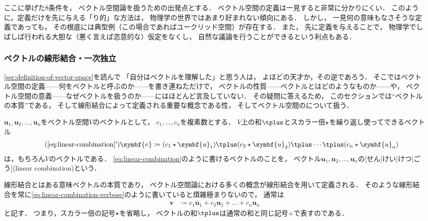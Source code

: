 \documentclass[
]{sotsu}
\begin{document}
ここに挙げた8条件を，
ベクトル空間論を扱うための出発点とする．
ベクトル空間の定義は一見すると非常に分かりにくい．
このように，定義だけを先に与える「り的」な方法は，
物理学の世界ではあまり好まれない傾向にある．
しかし，
一見何の意味もなさそうな定義であっても，
その根底には典型例（この場合であればユークリッド空間）が存在する．
また，
先に定義を与えることで，
物理学でしばしば行われる大胆な（悪く言えば恣意的な）仮定をなくし，
自然な議論を行うことができるという利点もある．





\subsubsection{ベクトルの線形結合・一次独立}
\label{sec:linear-combination-and-linearly-independent}


\cref{sec:definition-of-vector-space}を読んで
「自分はベクトルを理解した」と思う人は，
よほどの天才か，その逆であろう．
そこではベクトル空間の定義------\textsf{何をベクトルと呼ぶのか}------を書き連ねただけで，
ベクトルの性質------\textsf{ベクトルとはどのようなものか}------や，
ベクトル空間の意義------\textsf{なぜベクトルを扱うのか}------にはほとんど言及していない．
その疑問に答えるため，
このセクションでは``ベクトルの本質''である，
そして線形結合によって定義される重要な概念である性，
そしてベクトル空間のについて扱う．






\quad
$\symbf{u}_1, \symbf{u}_2, \dots, \symbf{u}_n$をベクトル空間$V$のベクトルとして，
$c_1, \dots, c_n$を複素数とする．
$V$上の和$\vecplus$とスカラー倍$\mathbin{\star}$を繰り返し使ってできるベクトル
\begin{equation}
    \label{eq:linear-combination-verbose}
    \tag{\ref*{eq:linear-combination}$'$}
        \symbf{v} \coloneq 
            (c_1 \scaprod \symbf{u}_1) \vecplus (c_2 \scaprod \symbf{u}_2) \vecplus \dotsb \vecplus (c_n \scaprod \symbf{u}_n)
\end{equation}
は，もちろん$V$のベクトルである．
\cref{eq:linear-combination}のように書けるベクトルのことを，
ベクトル$\symbf{u}_1, \symbf{u}_2, \dots, \symbf{u}_n$の[せん|けい|けつ|ごう](linear combination)という．

線形結合とはある意味ベクトルの本質であり，
ベクトル空間論における多くの概念が線形結合を用いて定義される．
そのような線形結合を常に\cref{eq:linear-combination-verbose}のように書いていると煩雑極まりないので，
通常は
\begin{equation}
    \label{eq:linear-combination}
    \begin{split}
        \symbf{v} 
        &\coloneq 
            c_1 \symbf{u}_1 + c_2 \symbf{u}_2 + \dots + c_n \symbf{u}_n
    \end{split}
\end{equation}
と記す．
つまり，スカラー倍の記号$\mathbin{\star}$を省略し，
ベクトルの和$\vecplus$は通常の和と同じ記号$+$で表すのである．
\end{document}
